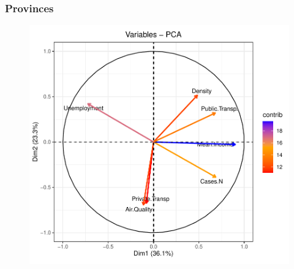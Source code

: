 \documentclass[compress]{beamer}
\begin{document}
\begin{frame}
\begin{figure}[H]
\begin{minipage}{.3\textwidth}
\end{minipage}
\end{figure}
\end{frame}

\begin{frame}


\frametitle{Provinces}


\begin{figure}[H]
\centering
\begin{minipage}{.5\textwidth}
  \centering
  \includegraphics[width=\linewidth, ]{Pic/Province_FULL_Variables-PCA.pdf}
\end{minipage}%
\begin{minipage}{.5\textwidth}
  \centering

\end{minipage}
\end{figure}
\end{frame}
\end{document}
